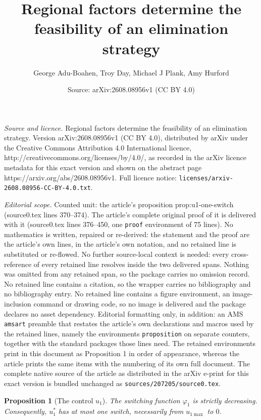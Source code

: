 \documentclass[10pt,a4paper]{amsart}
\title{Regional factors determine the feasibility of an elimination strategy}
\author{George Adu-Boahen, Troy Day, Michael J Plank, Amy Hurford}
\date{Source: arXiv:2608.08956v1 (CC BY 4.0)}
\newtheorem{proposition}{Proposition}
\begin{document}
\maketitle

\noindent\emph{Source and licence.} Regional factors determine the feasibility of an elimination strategy. Version arXiv:2608.08956v1 (CC BY 4.0), distributed by arXiv under the Creative Commons Attribution 4.0 International licence, http://creativecommons.org/licenses/by/4.0/, as recorded in the arXiv licence metadata for this exact version and shown on the abstract page https://arxiv.org/abs/2608.08956v1. Full licence notice: \texttt{licenses/arxiv-2608.08956-CC-BY-4.0.txt}.\par\smallskip

\noindent\textit{Editorial scope.} Counted unit: the article's proposition prop:u1-one-switch (source0.tex lines 370--374). The article's complete original proof of it is delivered with it (source0.tex lines 376--450, one \texttt{proof} environment of 75 lines). No mathematics is written, repaired or re-derived: the statement and the proof are the article's own lines, in the article's own notation, and no retained line is substituted or re-flowed.  No further source-local context is needed: every cross-reference of every retained line resolves inside the two delivered spans.  Nothing was omitted from any retained span, so the package carries no omission record.  No retained line contains a citation, so the wrapper carries no bibliography and no bibliography entry.  No retained line contains a figure environment, an image-inclusion command or drawing code, so no image is delivered and the package declares no asset dependency.  Editorial formatting only, in addition: an AMS \texttt{amsart} preamble that restates the article's own declarations and macros used by the retained lines, namely the environments \texttt{proposition} on separate counters, together with the standard packages those lines need.  The retained environments print in this document as Proposition 1 in order of appearance, whereas the article prints the same items with the numbering of its own full document.  The complete native source of the article as distributed in the arXiv e-print for this exact version is bundled unchanged as \texttt{sources/207205/source0.tex}.
\begin{proposition}[The control $u_1$]
\label{prop:u1-one-switch}
The switching function \(\varphi_1\) is strictly decreasing. Consequently,
\(u_1^*\) has at most one switch, necessarily from \(u_{1\max}\) to \(0\).
\end{proposition}
\end{document}
